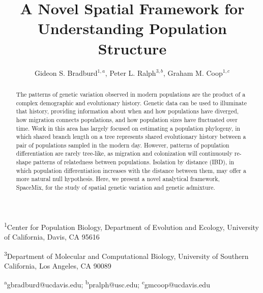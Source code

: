 \documentclass[12pt]{article}
\title{A Novel Spatial Framework for Understanding Population Structure}
\date{\vspace{-5ex}}
\author{Gideon S. Bradburd$^{1,a}$, Peter L. Ralph$^{3,b}$, Graham M. Coop$^{1,c}$}
\begin{document}
\maketitle

\textsuperscript{1}Center for Population Biology, Department of Evolution and Ecology, University of California, Davis, CA 95616

\textsuperscript{3}Department of Molecular and Computational Biology, University of Southern California, Los Angeles, CA 90089

\textsuperscript{a}gbradburd@ucdavis.edu; 
\textsuperscript{b}pralph@usc.edu;
\textsuperscript{c}gmcoop@ucdavis.edu\\\\\

\newpage

\begin{abstract}
The patterns of genetic variation observed in modern populations are the product of a complex demographic and evolutionary history.  Genetic data can be used to illuminate that history, providing information about when and how populations have diverged, how migration connects populations, and how population sizes have fluctuated over time.  Work in this area has largely focused on estimating a population phylogeny, in which shared branch length on a tree represents shared evolutionary history between a pair of populations sampled in the modern day.  However, patterns of population differentiation are rarely tree-like, as migration and colonization will continuously re-shape patterns of relatedness between populations.  Isolation by distance (IBD), in which population differentiation increases with the distance between them, may offer a more natural null hypothesis.  Here, we present a novel analytical framework, SpaceMix, for the study of spatial genetic variation and genetic admixture.
\end{abstract}

\newpage
\end{document}

